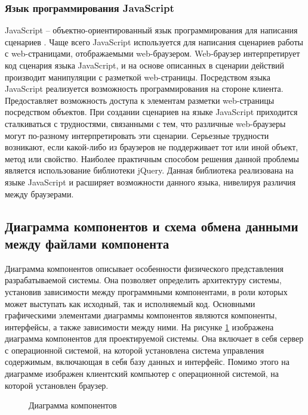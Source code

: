 \subsubsection{Язык программирования JavaScript}

JavaScript – объектно-ориентированный язык программирования для написания сценариев \cite{javascript}. Чаще всего JavaScript используется для написания сценариев работы с web-страницами, отображаемыми web-браузером. Web-бра\-у\-зер интерпретирует код сценария языка JavaScript, и на основе описанных в сценарии действий производит манипуляции с разметкой web-страницы. Посредством языка JavaScript реализуется возможность программирования на стороне клиента. Предоставляет возможность доступа к элементам разметки web-страницы посредством объектов. При создании сценариев на языке JavaScript приходится сталкиваться с трудностями, связанными с тем, что различные web-браузеры могут по-разному интерпретировать эти сценарии. Серьезные трудности возникают, если какой-либо из браузеров не поддерживает тот или иной объект, метод или свойство. Наиболее практичным способом решения данной проблемы является использование библиотеки jQuery. Данная библиотека реализована на языке JavaScript и расширяет возможности данного языка, нивелируя различия между браузерами.

\subsection{Диаграмма компонентов и схема обмена данными между файлами компонента}

Диаграмма компонентов описывает особенности физического представления разрабатываемой системы. Она позволяет определить архитектуру системы, установив зависимости между программными компонентами, в роли которых может выступать как исходный, так и исполняемый код. Основными графическими элементами диаграммы компонентов являются компоненты, интерфейсы, а также зависимости между ними. На рисунке \ref{comp:image} изображена диаграмма компонентов для проектируемой системы. Она включает в себя сервер с операционной системой, на которой установлена система управления содержимым, включающая в себя базу данных и интерфейс. Помимо этого на диаграмме изображен клиентский компьютер с операционной системой, на которой установлен браузер.

\begin{figure}[H]
\caption{Диаграмма компонентов}
\label{comp:image}
\end{figure}


